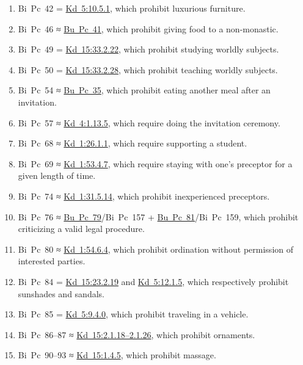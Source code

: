 \documentclass[12pt,openany]{book}%
\begin{document}
\begin{enumerate}
\item Bi Pc 42 = \href{https://suttacentral.net/pli-tv-kd5/en/brahmali\#10.5.1}{Kd~5:10.5.1}, which prohibit luxurious furniture.%
\item Bi Pc 46 ≈ \href{https://suttacentral.net/pli-tv-bu-vb-pc41/en/brahmali\#1.2.15.1}{Bu~Pc~41}, which prohibit giving food to a non-monastic.%
\item Bi Pc 49 = \href{https://suttacentral.net/pli-tv-kd15/en/brahmali\#33.2.22}{Kd~15:33.2.22}, which prohibit studying worldly subjects.%
\item Bi Pc 50 = \href{https://suttacentral.net/pli-tv-kd15/en/brahmali\#33.2.28}{Kd~15:33.2.28}, which prohibit teaching worldly subjects.%
\item Bi Pc 54 ≈ \href{https://suttacentral.net/pli-tv-bu-vb-pc35/en/brahmali\#2.15.1}{Bu~Pc~35}, which prohibit eating another meal after an invitation.%
\item Bi Pc 57 ≈ \href{https://suttacentral.net/pli-tv-kd4/en/brahmali\#1.13.5}{Kd~4:1.13.5}, which require doing the invitation ceremony.%
\item Bi Pc 68 ≈ \href{https://suttacentral.net/pli-tv-kd1/en/brahmali\#26.1.1}{Kd~1:26.1.1}, which require supporting a student.%
\item Bi Pc 69 ≈ \href{https://suttacentral.net/pli-tv-kd1/en/brahmali\#53.4.7}{Kd~1:53.4.7}, which require staying with one’s preceptor for a given length of time.%
\item Bi Pc 74 ≈ \href{https://suttacentral.net/pli-tv-kd1/en/brahmali\#31.5.14}{Kd~1:31.5.14}, which prohibit inexperienced preceptors.%
\item Bi Pc 76 ≈ \href{https://suttacentral.net/pli-tv-bu-vb-pc79/en/brahmali\#1.22.1}{Bu~Pc~79}/Bi Pc 157 + \href{https://suttacentral.net/pli-tv-bu-vb-pc81/en/brahmali\#1.16.1}{Bu~Pc~81}/Bi Pc 159, which prohibit criticizing a valid legal procedure.%
\item Bi Pc 80 ≈ \href{https://suttacentral.net/pli-tv-kd1/en/brahmali\#54.6.4}{Kd~1:54.6.4}, which prohibit ordination without permission of interested parties.%
\item Bi Pc 84 = \href{https://suttacentral.net/pli-tv-kd15/en/brahmali\#23.2.19}{Kd~15:23.2.19} and \href{https://suttacentral.net/pli-tv-kd5/en/brahmali\#12.1.5}{Kd~5:12.1.5}, which respectively prohibit sunshades and sandals.%
\item Bi Pc 85 = \href{https://suttacentral.net/pli-tv-kd5/en/brahmali\#9.4.0}{Kd~5:9.4.0}, which prohibit traveling in a vehicle.%
\item Bi Pc 86–87 ≈ \href{https://suttacentral.net/pli-tv-kd15/en/brahmali\#2.1.18}{Kd~15:2.1.18–2.1.26}, which prohibit ornaments.%
\item Bi Pc 90–93 ≈ \href{https://suttacentral.net/pli-tv-kd15/en/brahmali\#1.4.5}{Kd~15:1.4.5}, which prohibit massage.%
\end{enumerate}
\end{document}
